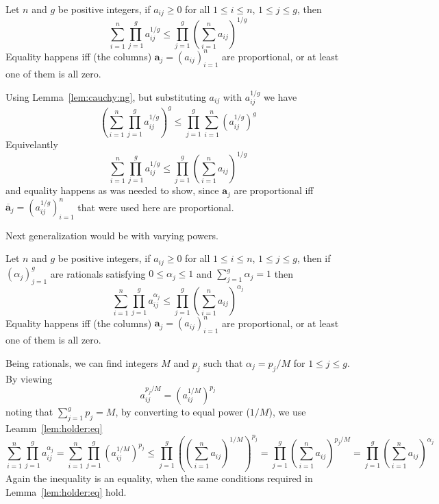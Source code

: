 \begin{lem} \label{lem:holder:eq}
Let $n$ and $g$ be positive integers,
if \(a_{ij}\geq 0\)
for all \(1\leq i \leq n\), \(1\leq j \leq g\),
then
\begin{equation}
 \sum_{i=1}^n \prod_{j=1}^g a_{ij}^{1/g}
 \leq
 \prod_{j=1}^g \left(\sum_{i=1}^n a_{ij}\right)^{1/g}
\end{equation}
Equality happens iff (the columns)
\(\mathbf{a}_j = (a_{ij})_{i=1}^n\) are proportional, or at least
one of them is all zero.
\end{lem}
\begin{thmproof}
Using Lemma~\ref{lem:cauchy:ng},
but substituting \(a_{ij}\) with \(a_{ij}^{1/g}\)
we have
\begin{equation*}
 \left(\sum_{i=1}^n \prod_{j=1}^g a_{ij}^{1/g}\right)^g
 \leq
 \prod_{j=1}^g \sum_{i=1}^n (a_{ij}^{1/g})^g
\end{equation*}
Equivelantly
\begin{equation*}
 \sum_{i=1}^n \prod_{j=1}^g a_{ij}^{1/g}
 \leq
 \prod_{j=1}^g \left(\sum_{i=1}^n a_{ij}\right)^{1/g}
\end{equation*}
and equality happens as was needed to show, since \(\mathbf{a}_j\)
are proportional iff \(\overline{\mathbf{a}}_j = (a_{ij}^{1/g})_{i=1}^n\)
that were used here are proportional.
\end{thmproof}


Next generalization would be with varying powers.
\begin{lem} \label{lem:holder:rat}
Let $n$ and $g$ be positive integers,
if \(a_{ij}\geq 0\)
for all \(1\leq i \leq n\), \(1\leq j \leq g\),
then
if \((\alpha_j)_{j=1}^g\) are rationals satisfying \(0\leq \alpha_j \leq 1\)
and \(\sum_{j=1}^g \alpha_j = 1\) then
\begin{equation}
 \sum_{i=1}^n \prod_{j=1}^g a_{ij}^{\alpha_j}
 \leq
 \prod_{j=1}^g \left(\sum_{i=1}^n a_{ij}\right)^{\alpha_j}
\end{equation}
Equality happens iff (the columns)
\(\mathbf{a}_j = (a_{ij})_{i=1}^n\) are proportional, or at least
one of them is all zero.
\end{lem}
\begin{thmproof}
Being rationals, we can find integers $M$ and \(p_j\) such that
\(\alpha_j = p_j/M\) for \(1\leq j \leq g\).
By viewing
\begin{equation*}
a_{ij}^{p_j/M} = \left(a_{ij}^{1/M}\right)^{p_j}
\end{equation*}
noting that \(\sum_{j=1}^g p_j = M\),
by converting to equal power (\(1/M\)),
we use Leamm~\ref{lem:holder:eq}
\begin{equation*}
     \sum_{i=1}^n \prod_{j=1}^g a_{ij}^{\alpha_j}
 =   \sum_{i=1}^n \prod_{j=1}^g \left(a_{ij}^{1/M}\right)^{p_j}
\leq \prod_{j=1}^g \left(\left(\sum_{i=1}^n a_{ij}\right)^{1/M}\right)^{p_j}
=    \prod_{j=1}^g \left(\sum_{i=1}^n a_{ij}\right)^{p_j/M}
=    \prod_{j=1}^g \left(\sum_{i=1}^n a_{ij}\right)^{\alpha_j}
\end{equation*}
Again the inequality is an equality, when the same conditions
required in Lemma~\ref{lem:holder:eq} hold.
\end{thmproof}

